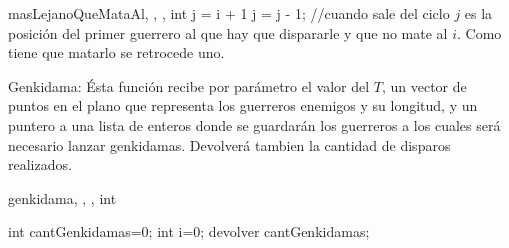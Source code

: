 	\begin{algoritmo}{masLejanoQueMataAl}{, , , }{int}
		j = i + 1 \;
  		j = j - 1;\; //cuando sale del ciclo $j$ es la posición del primer guerrero al que hay que dispararle y que no mate al $i$. Como tiene que matarlo se retrocede uno. 

	\end{algoritmo} \;

		
		Genkidama:
		Ésta función recibe por parámetro el valor del $T$,  un vector de puntos en el plano que representa los guerreros enemigos y su longitud, y un puntero a una lista de enteros donde se guardarán los guerreros a los cuales será necesario lanzar genkidamas. Devolverá tambien la cantidad de disparos realizados. \\

	\begin{algoritmo}{genkidama}{, , , }{int}

		int cantGenkidamas=0;
  		int i=0;
  		devolver cantGenkidamas; \;
	\end{algoritmo} \;
	



